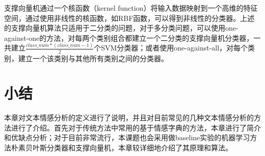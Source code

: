 支撑向量机通过一个核函数（kernel function）将输入数据映射到一个高维的特征空间，通过使用非线性的核函数，如RBF函数，可以得到非线性的分类器。上述的支撑向量机算法只适用于二分类的问题，对于多分类问题，可以使用one-against-one的方法，对每两个类别组合都建立一个二分类的支撑向量机分类器，一共建立$\frac{class\_num * (class\_num - 1)}{2}$个SVM分类器；或者使用one-against-all，对每个类别，建立一个该类别与其他所有类别之间的分类器。

\section{小结}
本章对文本情感分析的定义进行了说明，并且对目前常见的几种文本情感分析的方法进行了介绍。首先对于传统方法中常用的基于情感字典的方法，本章进行了简介和优缺点分析；对于目前非常流行，本课题也会采用做baseline实验的机器学习方法朴素贝叶斯分类器和支撑向量机，本章较详细地介绍了其原理和算法。
